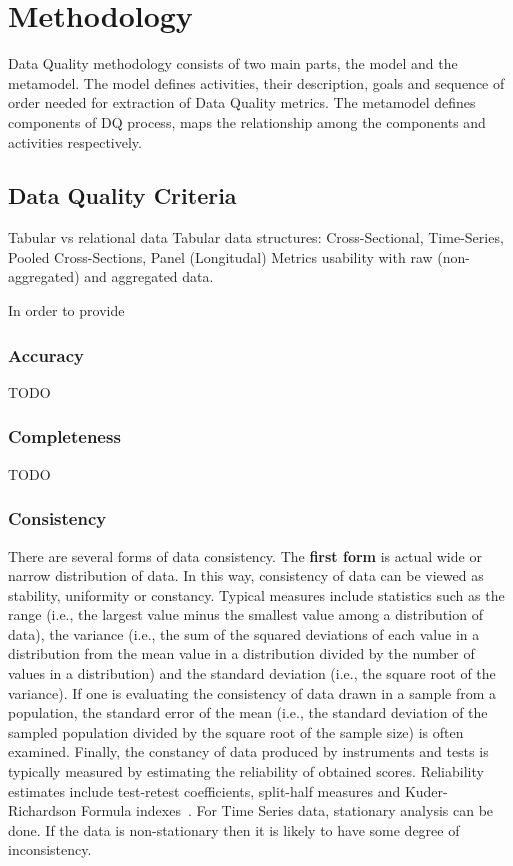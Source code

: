 \chapter{Methodology}\label{ch:methodology}

Data Quality methodology consists of two main parts, the model and the metamodel.
The model defines activities, their description, goals and sequence of order needed for extraction of Data Quality metrics.
The metamodel defines components of DQ process, maps the relationship among the components and activities respectively.

\section{Data Quality Criteria}

Tabular vs relational data
Tabular data structures: Cross-Sectional, Time-Series, Pooled Cross-Sections, Panel (Longitudal)
Metrics usability with raw (non-aggregated) and aggregated data.


In order to provide 

\subsection{Accuracy}

TODO

\subsection{Completeness}

TODO

\subsection{Consistency}

There are several forms of data consistency.
The \textbf{first form} is actual wide or narrow distribution of data.
In this way, consistency of data can be viewed as stability, uniformity or constancy.
Typical measures include statistics such as the range (i.e., the largest value minus the smallest value among a distribution of data), the variance (i.e., the sum of the squared deviations of each value in a distribution from the mean value in a distribution divided by the number of values in a distribution) and the standard deviation (i.e., the square root of the variance).
If one is evaluating the consistency of data drawn in a sample from a population, the standard error of the mean (i.e., the standard deviation of the sampled population divided by the square root of the sample size) is often examined.
Finally, the constancy of data produced by instruments and tests is typically measured by estimating the reliability of obtained scores.
Reliability estimates include test-retest coefficients, split-half measures and Kuder-Richardson Formula  indexes~\cite{quora:consistency2017}.
For Time Series data, stationary analysis can be done.
If the data is non-stationary then it is likely to have some degree of inconsistency.

